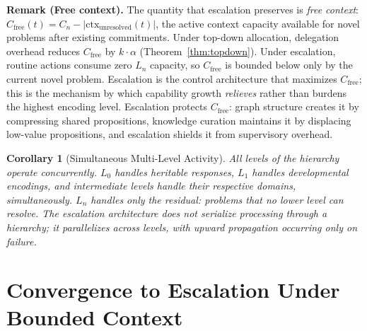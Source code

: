 \documentclass[11pt]{article}
\newtheorem{corollary}[theorem]{Corollary}
\theoremstyle{definition}
\begin{document}
\textbf{Remark (Free context).}
The quantity that escalation preserves is \emph{free context}:
$C_{\mathrm{free}}(t) = C_n -
|\mathrm{ctx}_{\mathrm{unresolved}}(t)|$, the active context capacity
available for novel problems after existing commitments. Under
top-down allocation, delegation overhead reduces
$C_{\mathrm{free}}$ by $k \cdot \alpha$
(Theorem~\ref{thm:topdown}). Under escalation, routine actions
consume zero $L_n$ capacity, so $C_{\mathrm{free}}$ is bounded below
only by the current novel problem. Escalation is the control
architecture that maximizes $C_{\mathrm{free}}$; this is the
mechanism by which capability growth \emph{relieves} rather than
burdens the highest encoding level. Escalation protects
$C_{\mathrm{free}}$: graph structure creates it by compressing
shared propositions, knowledge curation maintains it by displacing
low-value propositions, and escalation shields it from supervisory
overhead.

\begin{corollary}[Simultaneous Multi-Level Activity]
\label{cor:simultaneous}
All levels of the hierarchy operate concurrently. $L_0$ handles
heritable responses, $L_1$ handles developmental encodings, and
intermediate levels handle their respective domains,
simultaneously. $L_n$ handles only the residual: problems that no
lower level can resolve. The escalation architecture does not
serialize processing through a hierarchy; it parallelizes across levels,
with upward propagation occurring only on failure.
\end{corollary}

\section{Convergence to Escalation Under Bounded Context}
\label{sec:topdown}
\end{document}
